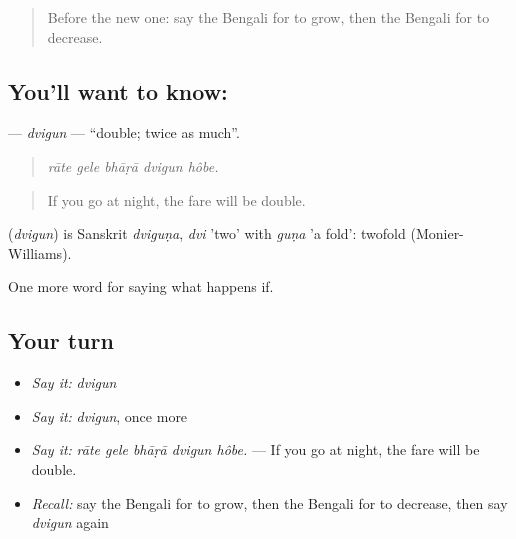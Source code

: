 \label{lesson:BN-C372-dvigun}



\begin{quote}
Before the new one: say the Bengali for to grow, then the Bengali for to decrease.
\end{quote}

\subsection*{You'll want to know: }
\textbf{} — \emph{dvigun} — \textquotedblleft{}double; twice as much\textquotedblright{}.

\begin{quote}
    
\end{quote}

\begin{quote}
\emph{rāte gele bhāṛā dvigun hôbe.}
\end{quote}

\begin{quote}
If you go at night, the fare will be double.
\end{quote}

\begin{cousinweb}
\textbf{} (\emph{dvigun}) is Sanskrit \emph{dviguṇa}, \emph{dvi} 'two' with \emph{guṇa} 'a fold': twofold (Monier-Williams).
\end{cousinweb}

\begin{grammarlens}[title={What you've built}]
One more word for saying what happens if.
\end{grammarlens}

\subsection*{Your turn}
\begin{itemize}
\raggedright
  \item \emph{Say it:} \emph{dvigun}
  \item \emph{Say it:} \emph{dvigun}, once more
  \item \emph{Say it:} \emph{rāte gele bhāṛā dvigun hôbe.} — If you go at night, the fare will be double.
  \item \emph{Recall:} say the Bengali for to grow, then the Bengali for to decrease, then say \emph{dvigun} again
\end{itemize}

